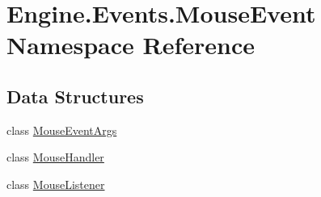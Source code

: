 \hypertarget{a00248}{}\section{Engine.\+Events.\+Mouse\+Event Namespace Reference}
\label{a00248}
\subsection*{Data Structures}
\begin{DoxyCompactItemize}
\item 
class \hyperlink{a00374}{Mouse\+Event\+Args}
\item 
class \hyperlink{a00378}{Mouse\+Handler}
\item 
class \hyperlink{a00382}{Mouse\+Listener}
\end{DoxyCompactItemize}
